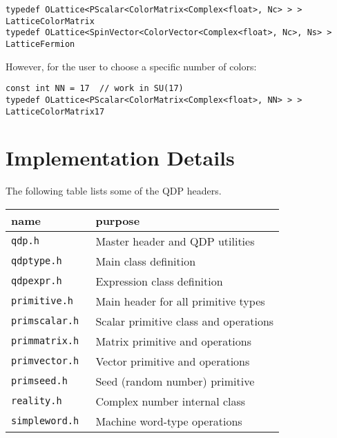 \documentclass[12pt,letterpaper]{article}
\begin{document}
\begin{verbatim}
typedef OLattice<PScalar<ColorMatrix<Complex<float>, Nc> > > LatticeColorMatrix
typedef OLattice<SpinVector<ColorVector<Complex<float>, Nc>, Ns> > LatticeFermion
\end{verbatim}

However, for the user to choose a specific number of colors:

\begin{verbatim}
const int NN = 17  // work in SU(17)
typedef OLattice<PScalar<ColorMatrix<Complex<float>, NN> > > LatticeColorMatrix17
\end{verbatim}

\section{Implementation Details}
\label{sec:implementation}

The following table lists some of the QDP headers.
\begin{center}
\begin{tabular}{|l|l|}
\hline
 name & purpose \\
\hline
 {\tt qdp.h        } & Master header and QDP utilities     \\
 {\tt qdptype.h    } & Main class definition               \\
 {\tt qdpexpr.h    } & Expression class definition         \\
 {\tt primitive.h  } & Main header for all primitive types \\
 {\tt primscalar.h } & Scalar primitive class and operations \\
 {\tt primmatrix.h } & Matrix primitive and operations \\
 {\tt primvector.h } & Vector primitive and operations \\
 {\tt primseed.h   } & Seed (random number) primitive  \\
 {\tt reality.h    } & Complex number internal class  \\
 {\tt simpleword.h } & Machine word-type operations  \\
\hline
\end{tabular}
\end{center}


\newpage

\end{document}
